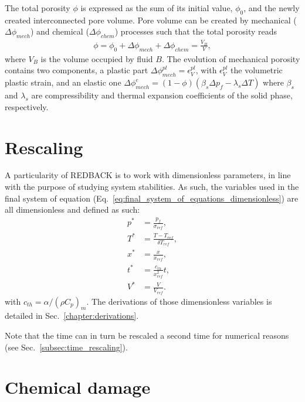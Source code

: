 \documentclass[]{scrreprt}
\newcommand{\redback}{{REDBACK}}
\begin{document}
The total porosity $\phi$ is expressed as the sum of its initial value, $\phi_0$,
and the newly created interconnected pore volume. Pore volume can be created
by mechanical ($\Delta\phi_{mech}$) and chemical ($\Delta \phi_{chem}$)
processes such that the total porosity reads
\begin{eqnarray}
    \label{eq:porosity}
    \phi = \phi_0 + \Delta\phi_{mech} + \Delta\phi_{chem} = \frac{V_{B}}{V},
\end{eqnarray}
where $V_B$ is the volume occupied by fluid $B$.  The evolution of mechanical
porosity contains two components, a plastic part $\Delta
\phi^{pl}_{mech}=\epsilon^{pl}_V$, with $\epsilon^{pl}_V$ the volumetric plastic strain, and an
elastic one $\Delta \phi^{e}_{mech}=(1-\phi)\left( \beta_s \Delta p_f -
\lambda_s \Delta T \right)$
where $\beta_s$ and $\lambda_s$ are compressibility and
thermal expansion coefficients of the solid phase, respectively.

\section{Rescaling}
\label{sec:rescaling}
A particularity of \redback{} is to work with dimensionless parameters, in line with the purpose of studying system stabilities. As such, the variables used in the final system of equation (Eq.~\ref{eq:final_system_of_equations_dimensionless}) are all dimensionless and defined as such:
\begin{subequations}
  \label{eq:dimensionless_defs}
  \begin{align}
  p^* &= \frac{p_f}{\sigma_{ref}}, \\   
  T^* &= \frac{T-T_{ref}}{\delta T_{ref}}, \\   
  x^* &= \frac{x}{x_{ref}}, \\   
  t^* &= \frac{c_{th}}{x^2_{ref}}t, \\   
  V^* &= \frac{V}{V_{ref}}.
  \end{align}
\end{subequations}
with $c_{th} = \alpha / (\rho C_p)_m$. The derivations of those dimensionless variables is detailed in Sec.~\ref{chapter:derivations}.

Note that the time can in turn be rescaled a second time for numerical reasons (see Sec.~\ref{subsec:time_rescaling}).


\section{Chemical damage}
\label{sec:chem_damage}
\end{document}
